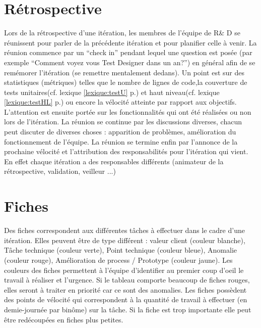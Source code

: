 \section{Rétrospective}
Lors de la rétrospective d'une itération, les membres de l'équipe de R\& D se réunissent pour parler de la précédente itération et pour planifier celle à venir. La réunion commence par un ``check in'' pendant lequel une question est posée (par exemple ``Comment voyez vous Test Designer dans un an?'') en général afin de se remémorer l'itération (se remettre mentalement dedans). Un point est sur des statistiques (métriques) telles que le nombre de lignes de code,la couverture de tests unitaires(cf. lexique \ref{lexique:testU} p.\pageref{lexique:testU}) et haut niveau(cf. lexique \ref{lexique:testHL} p.\pageref{lexique:testHL}) ou encore la vélocité atteinte par rapport aux objectifs. L'attention est ensuite portée sur les fonctionnalités qui ont été réalisées ou non lors de l'itération. La réunion se continue par les discussions diverses, chacun peut discuter de diverses choses : apparition de problèmes, amélioration du fonctionnement de l'équipe. La réunion se termine enfin par l'annonce de la prochaine vélocité et l'attribution des responsabilités pour l'itération qui vient. En effet chaque itération a des responsables différents (animateur de la rétrospective, validation, veilleur ...)

\section{Fiches}\label{agile:fiches}
Des fiches correspondent aux différentes tâches à effectuer dans le cadre d'une itération. Elles peuvent être de type différent : valeur client (couleur blanche), Tâche technique (couleur verte), Point technique (couleur bleue), Anomalie (couleur rouge), Amélioration de process / Prototype (couleur jaune). Les couleurs des fiches permettent à l'équipe d'identifier au premier coup d'oeil le travail à réaliser et l'urgence. Si le tableau comporte beaucoup de fiches rouges, elles seront à traiter en priorité car ce sont des anomalies. Les fiches possèdent des points de vélocité qui correspondent à la quantité de travail à effectuer (en demie-journée par binôme) sur la tâche. Si la fiche est trop importante elle peut être redécoupées en fiches plus petites.

